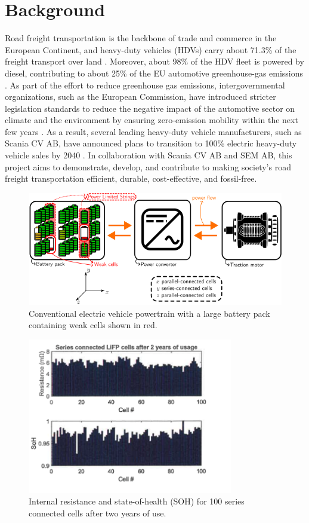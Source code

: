 \documentclass{article}
\begin{document}
\section{Background}
Road freight transportation is the backbone of trade and commerce in the European Continent, and heavy-duty vehicles (HDVs) carry about 71.3\% of the freight transport over land \cite{aceatrucks}. Moreover, about 98\% of the HDV fleet is powered by diesel, contributing to about 25\% of the EU automotive greenhouse-gas emissions \cite{ccesregulation}. As part of the effort to reduce greenhouse gas emissions, intergovernmental organizations, such as the European Commission, have introduced stricter legislation standards to reduce the negative impact of the automotive sector on climate and the environment by ensuring zero-emission mobility within the next few years \cite{european2011communication}. As a result, several leading heavy-duty vehicle manufacturers, such as Scania CV AB, have announced plans to transition to 100\% electric heavy-duty vehicle sales by 2040 \cite{ragon2021co2}. In collaboration with Scania CV AB and SEM AB, this project aims to demonstrate, develop, and contribute to making society's road freight transportation efficient, durable, cost-effective, and fossil-free.
\begin{figure}[!t]
    \centering
    \includegraphics[width=\textwidth]{Figures/conventional_powertrain.png}
    \caption{Conventional electric vehicle powertrain with a large battery pack containing weak cells shown in red.}
    \label{fig:convEVpoertrain}
\end{figure}
\begin{figure}[!b]
    \centering
    \includegraphics[width=0.8\textwidth]{Figures/SOC_IR_dist.png}
    \caption{ Internal resistance and state-of-health (SOH) for 100 series connected cells after two years of use.}
    \label{fig:IR_SOC_dist}
\end{figure}
\end{document}
